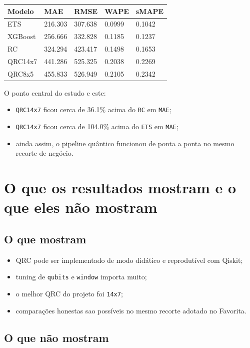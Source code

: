 \documentclass[12pt]{article}
\providecommand{\tightlist}{%
              \setlength{\itemsep}{0pt}\setlength{\parskip}{0pt}}
\begin{document}
\begin{longtable}[]{@{}lllll@{}}
\toprule\noalign{}
Modelo & MAE & RMSE & WAPE & sMAPE \\
\midrule\noalign{}
\endhead
\bottomrule\noalign{}
\endlastfoot
ETS & 216.303 & 307.638 & 0.0999 & 0.1042 \\
XGBoost & 256.666 & 332.828 & 0.1185 & 0.1237 \\
RC & 324.294 & 423.417 & 0.1498 & 0.1653 \\
QRC14x7 & 441.286 & 525.325 & 0.2038 & 0.2269 \\
QRC8x5 & 455.833 & 526.949 & 0.2105 & 0.2342 \\
\end{longtable}

O ponto central do estudo e este:

\begin{itemize}
\tightlist
\item
  \texttt{QRC14x7} ficou cerca de 36.1\% acima do \texttt{RC} em \texttt{MAE};
\item
  \texttt{QRC14x7} ficou cerca de 104.0\% acima do \texttt{ETS} em \texttt{MAE};
\item
  ainda assim, o pipeline quântico funcionou de ponta a ponta no mesmo recorte de negócio.
\end{itemize}

\section{O que os resultados mostram e o que eles não mostram}\label{8-o-que-os-resultados-mostram-e-o-que-eles-nuxe3o-mostram}

\subsection{O que mostram}\label{81-o-que-mostram}

\begin{itemize}
\tightlist
\item
  QRC pode ser implementado de modo didático e reprodutível com Qiskit;
\item
  tuning de \texttt{qubits} e \texttt{window} importa muito;
\item
  o melhor QRC do projeto foi \texttt{14x7};
\item
  comparações honestas sao possíveis no mesmo recorte adotado no Favorita.
\end{itemize}

\subsection{O que não mostram}\label{82-o-que-nuxe3o-mostram}
\end{document}
